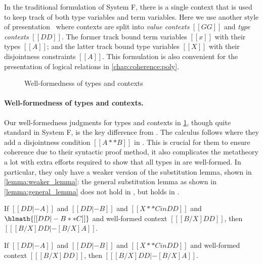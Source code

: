 In the traditional formulation of System F, there is a single context that is
used to keep track of both type variables and term variables. Here we use
another style of presentation~\citep[chap. 16]{Harper_2016} where contexts are
split into \textit{value contexts} $[[GG]]$ and \textit{type contexts} $[[DD]]$.
The former track bound term variables $[[x]]$ with their types $[[A]]$; and the
latter track bound type variables $[[X]]$ with their disjointness constraints
$[[A]]$. This formulation is also convenient for the presentation of logical
relations in \cref{chap:coherence:poly}.

\begin{figure}[t]
  \centering
  \caption{Well-formedness of types and contexts}
  \label{fig:well-formedness:fi}
\end{figure}

\paragraph{Well-formedness of types and contexts.}

Our well-formedness judgments for types and contexts in
\cref{fig:well-formedness:fi}, though quite standard in System F, is the key
difference from \fname. The \fname calculus follows \oname where they add a
disjointness condition $[[ A ** B ]]$ in . This is crucial for
them to ensure coherence due to their syntactic proof method, it also
complicates the metatheory a lot with extra efforts required to show that all
types in \fname are well-formed. In particular, they only have a weaker version
of the substitution lemma, shown in \cref{lemma:weaker_lemma}: the general
substitution lemma as shown in \cref{lemma:general_lemma} does not hold in
\fname, but holds in \fnamee.

\begin{lemma} \label{lemma:weaker_lemma}
  If $[[DD |- A]]$ and $[[DD |- B]]$ and $[[ X ** C in DD  ]]$ and $\hlmath{[[ DD |- B ** C ]]}$
  and well-formed context $[[ [ B / X ] DD    ]]$, then $[[  [ B / X ] DD |- [B / X] A      ]]$.
\end{lemma}

\begin{lemma} \label{lemma:general_lemma}
  If $[[DD |- A]]$ and $[[DD |- B]]$ and $[[ X ** C in DD  ]]$
  and well-formed context $[[ [ B / X ] DD    ]]$, then $[[  [ B / X ] DD |- [B / X] A      ]]$.
\end{lemma}



